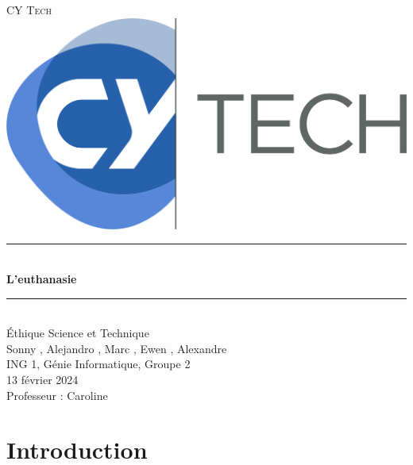 \documentclass[11pt, titlepage]{article}
\begin{document}

\begin{titlepage}
\newcommand{\HRule}{\rule{\linewidth}{0.5mm}}
\center

\textsc{\LARGE CY Tech} \\[1cm]

\includegraphics[scale=0.1]{img/cy-tech.png} \\[1cm]

\HRule \\[0.4cm]
{ \huge \bfseries L'euthanasie \\[0.4cm] }
\HRule \\[1.5cm]

{\LARGE Éthique Science et Technique} \\[1cm]

Sonny , Alejandro , Marc , Ewen , Alexandre  \\[0.2cm]
ING 1, Génie Informatique, Groupe 2 \\[1cm]

13 février 2024 \\ [1cm]

Professeur : Caroline  \\ [1cm]

\end{titlepage}


\newpage

\strut
\thispagestyle{empty} %
\newpage


\tableofcontents
\newpage


\listoffigures
\newpage



\section{Introduction}
\end{document}
